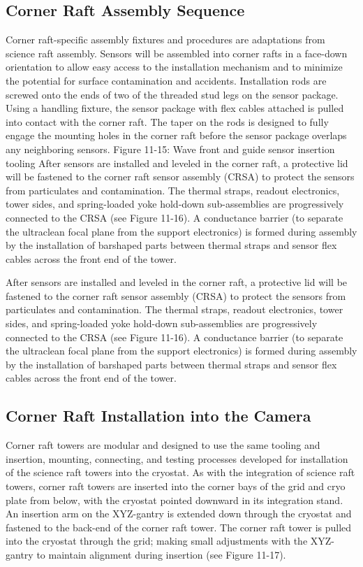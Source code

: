 \subsection{Corner Raft Assembly Sequence}

Corner raft-specific assembly fixtures and procedures are adaptations from science raft assembly.
Sensors will be assembled into corner rafts in a face-down orientation to allow easy access to the
installation mechanism and to minimize the potential for surface contamination and accidents.
Installation rods are screwed onto the ends of two of the threaded stud legs on the sensor package.
Using a handling fixture, the sensor package with flex cables attached is pulled into contact with the
corner raft. The taper on the rods is designed to fully engage the mounting holes in the corner raft
before the sensor package overlaps any neighboring sensors.
Figure 11-15: Wave front and guide sensor insertion tooling
After sensors are installed and leveled in the corner raft, a protective lid will be fastened to the corner
raft sensor assembly (CRSA) to protect the sensors from particulates and contamination. The thermal
straps, readout electronics, tower sides, and spring-loaded yoke hold-down sub-assemblies are
progressively connected to the CRSA (see Figure 11-16). A conductance barrier (to separate the ultraclean
focal plane from the support electronics) is formed during assembly by the installation of barshaped
parts between thermal straps and sensor flex cables across the front end of the tower.

After sensors are installed and leveled in the corner raft, a protective lid will be fastened to the corner
raft sensor assembly (CRSA) to protect the sensors from particulates and contamination. The thermal
straps, readout electronics, tower sides, and spring-loaded yoke hold-down sub-assemblies are
progressively connected to the CRSA (see Figure 11-16). A conductance barrier (to separate the ultraclean
focal plane from the support electronics) is formed during assembly by the installation of barshaped
parts between thermal straps and sensor flex cables across the front end of the tower.

\subsection{Corner Raft Installation into the Camera}

Corner raft towers are modular and designed to use the same tooling and insertion, mounting,
connecting, and testing processes developed for installation of the science raft towers into the cryostat.
As with the integration of science raft towers, corner raft towers are inserted into the corner bays of the
grid and cryo plate from below, with the cryostat pointed downward in its integration stand. An
insertion arm on the XYZ-gantry is extended down through the cryostat and fastened to the back-end of
the corner raft tower. The corner raft tower is pulled into the cryostat through the grid; making small
adjustments with the XYZ-gantry to maintain alignment during insertion (see Figure 11-17).

